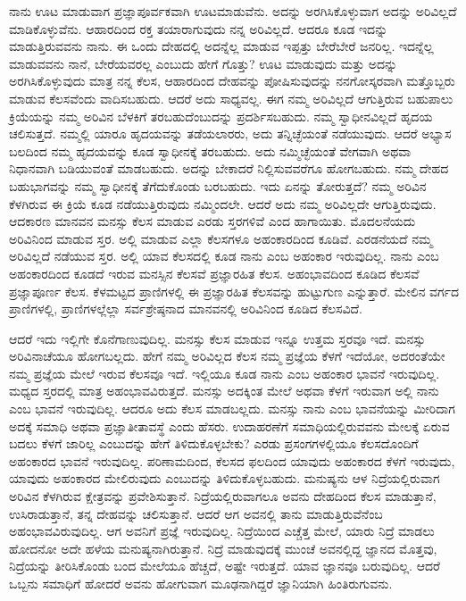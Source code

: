 \vskip 0.3cm

ನಾನು ಊಟ ಮಾಡುವಾಗ ಪ್ರಜ್ಞಾಪೂರ್ವಕವಾಗಿ ಊಟಮಾಡುವೆನು. ಅದನ್ನು ಅರಗಿಸಿಕೊಳ್ಳುವಾಗ ಅದನ್ನು ಅರಿವಿಲ್ಲದೆ ಮಾಡಿಕೊಳ್ಳುವೆನು. ಆಹಾರದಿಂದ ರಕ್ತ ತಯಾರಾಗುವುದು ನನ್ನ ಅರಿವಿಲ್ಲದೆ. ಆದರೂ ಕೂಡ ಇದನ್ನು ಮಾಡುತ್ತಿರುವವನು ನಾನು. ಈ ಒಂದು ದೇಹದಲ್ಲಿ ಅದನ್ನೆಲ್ಲ ಮಾಡುವ ಇಪ್ಪತ್ತು ಬೇರೆಬೇರೆ ಜನರಿಲ್ಲ. ಇದನ್ನೆಲ್ಲ ಮಾಡುವವನು ನಾನೆ, ಬೇರೆಯವರಲ್ಲ ಎಂಬುದು ಹೇಗೆ ಗೊತ್ತು? ಊಟ ಮಾಡುವುದು ಮತ್ತು ಅದನ್ನು ಅರಗಿಸಿಕೊಳ್ಳುವುದು ಮಾತ್ರ ನನ್ನ ಕೆಲಸ, ಆಹಾರದಿಂದ ದೇಹವನ್ನು ಪೋಷಿಸುವುದನ್ನು ನನಗೋಸ್ಕರವಾಗಿ ಮತ್ತೊಬ್ಬರು ಮಾಡುವ ಕೆಲಸವೆಂದು ವಾದಿಸಬಹುದು. ಆದರೆ ಅದು ಸಾಧ್ಯವಲ್ಲ. ಈಗ ನಮ್ಮ ಅರಿವಿಲ್ಲದೆ ಆಗುತ್ತಿರುವ ಬಹುಪಾಲು ಕ್ರಿಯೆಯನ್ನು ನಮ್ಮ ಅರಿವಿನ ಬೆಳಕಿಗೆ ತರಬಹುದೆಂಬುದನ್ನು ಪ್ರದರ್ಶಿಸಬಹುದು. ನಮ್ಮ ಸ್ವಾಧೀನವಿಲ್ಲದೆ ಹೃದಯ ಚಲಿಸುತ್ತದೆ. ನಮ್ಮಲ್ಲಿ ಯಾರೂ ಹೃದಯವನ್ನು ತಡೆಯಲಾರರು, ಅದು ತನ್ನಿಚ್ಛೆಯಂತೆ ನಡೆಯುವುದು. ಆದರೆ ಅಭ್ಯಾಸ ಬಲದಿಂದ ನಮ್ಮ ಹೃದಯವನ್ನು ಕೂಡ ಸ್ವಾಧೀನಕ್ಕೆ ತರಬಹುದು. ಅದು ನಮ್ಮಿಚ್ಛೆಯಂತೆ ವೇಗವಾಗಿ ಅಥವಾ ನಿಧಾನವಾಗಿ ಬಡಿಯುವಂತೆ ಮಾಡಬಹುದು. ಅದನ್ನು ಬೇಕಾದರೆ ನಿಲ್ಲಿಸುವವರೆಗೂ ಹೋಗಬಹುದು. ನಮ್ಮ ದೇಹದ ಬಹುಭಾಗವನ್ನು ನಮ್ಮ ಸ್ವಾಧೀನಕ್ಕೆ ತೆಗೆದುಕೊಂಡು ಬರಬಹುದು. ಇದು ಏನನ್ನು ತೋರುತ್ತದೆ? ನಮ್ಮ ಅರಿವಿನ ಕೆಳಗಿರುವ ಈ ಕ್ರಿಯೆ ಕೂಡ ನಡೆಯುತ್ತಿರುವುದು ನಮ್ಮಿಂದಲೇ. ಆದರೆ ಅದು ನಮ್ಮ ಅರಿವಿಲ್ಲದೇ ಆಗುತ್ತಿರುವುದು. ಆದಕಾರಣ ಮಾನವನ ಮನಸ್ಸು ಕೆಲಸ ಮಾಡುವ ಎರಡು ಸ್ತರಗಳಿವೆ ಎಂದ ಹಾಗಾಯಿತು. ಮೊದಲನೆಯದು ಅರಿವಿನಿಂದ ಮಾಡುವ ಸ್ತರ. ಅಲ್ಲಿ ಮಾಡುವ ಎಲ್ಲಾ ಕೆಲಸಗಳೂ ಅಹಂಕಾರದಿಂದ ಕೂಡಿವೆ. ಎರಡನೆಯದೆ ನಮ್ಮ ಅರಿವಿಲ್ಲದೆ ನಡೆಯುವ ಸ್ತರ. ಅಲ್ಲಿ ಯಾವ ಕೆಲಸದಲ್ಲಿ ಕೂಡ ನಾನು ಎಂಬ ಅಹಂಕಾರ ಇರುವುದಿಲ್ಲ. ನಾನು ಎಂಬ ಅಹಂಕಾರದಿಂದ ಕೂಡದೆ ಇರುವ ಮನಸ್ಸಿನ ಕೆಲಸವೆ ಪ್ರಜ್ಞಾರಹಿತ ಕೆಲಸ. ಅಹಂಭಾವದಿಂದ ಕೂಡಿದ ಕೆಲಸವೆ ಪ್ರಜ್ಞಾಪೂರ್ಣ ಕೆಲಸ. ಕೆಳಮಟ್ಟದ ಪ್ರಾಣಿಗಳಲ್ಲಿ ಈ ಪ್ರಜ್ಞಾರಹಿತ ಕೆಲಸವನ್ನು ಹುಟ್ಟುಗುಣ ಎನ್ನುತ್ತಾರೆ. ಮೇಲಿನ ವರ್ಗದ ಪ್ರಾಣಿಗಳಲ್ಲಿ, ಪ್ರಾಣಿಗಳಲ್ಲೆಲ್ಲಾ ಸರ್ವಶ್ರೇಷ್ಠನಾದ ಮಾನವನಲ್ಲಿ ಅರಿವಿನಿಂದ ಕೂಡಿದ ಕೆಲಸವಿದೆ. 

\vskip 0.3cm

ಆದರೆ ಇದು ಇಲ್ಲಿಗೇ ಕೊನೆಗಾಣುವುದಿಲ್ಲ. ಮನಸ್ಸು ಕೆಲಸ ಮಾಡುವ ಇನ್ನೂ ಉತ್ತಮ ಸ್ತರವೂ ಇದೆ. ಮನಸ್ಸು ಅರಿವಿನಾಚೆಯೂ ಹೋಗಬಲ್ಲದು. ಹೇಗೆ ನಮ್ಮ ಅರಿವಿಲ್ಲದ ಕೆಲಸ ನಮ್ಮ ಪ್ರಜ್ಞೆಯ ಕೆಳಗೆ ಇದೆಯೋ, ಅದರಂತೆಯೇ ನಮ್ಮ ಪ್ರಜ್ಞೆಯ ಮೇಲೆ ಇರುವ ಕೆಲಸವೂ ಇದೆ. ಇಲ್ಲಿಯೂ ಕೂಡ ನಾನು ಎಂಬ ಅಹಂಕಾರ ಭಾವನೆ ಇರುವುದಿಲ್ಲ. ಮಧ್ಯದ ಸ್ತರದಲ್ಲಿ ಮಾತ್ರ ಅಹಂಭಾವವಿರುತ್ತದೆ. ಮನಸ್ಸು ಅದಕ್ಕಿಂತ ಮೇಲೆ ಅಥವಾ ಕೆಳಗೆ ಇರುವಾಗ ಅಲ್ಲಿ ನಾನು ಎಂಬ ಭಾವನೆ ಇರುವುದಿಲ್ಲ. ಆದರೂ ಅದು ಕೆಲಸ ಮಾಡಬಲ್ಲದು. ಮನಸ್ಸು ನಾನು ಎಂಬ ಭಾವನೆಯನ್ನು ಮೀರಿದಾಗ ಅದಕ್ಕೆ ಸಮಾಧಿ ಅಥವಾ ಪ್ರಜ್ಞಾತೀತಾವಸ್ಥೆ ಎಂದು ಹೆಸರು. ಉದಾಹರಣೆಗೆ ಸಮಾಧಿಯಲ್ಲಿರುವವನು ಮೇಲಕ್ಕೆ ಏರುವ ಬದಲು ಕೆಳಗೆ ಜಾರಿಲ್ಲ ಎಂಬುದನ್ನು ಹೇಗೆ ತಿಳಿದುಕೊಳ್ಳಬೇಕು? ಎರಡು ಪ್ರಸಂಗಗಳಲ್ಲಿಯೂ ಕೆಲಸದೊಂದಿಗೆ ಅಹಂಕಾರದ ಭಾವನೆ ಇರುವುದಿಲ್ಲ. ಪರಿಣಾಮದಿಂದ, ಕೆಲಸದ ಫಲದಿಂದ ಯಾವುದು ಅಹಂಕಾರದ ಕೆಳಗೆ ಇರುವುದು, ಯಾವುದು ಅಹಂಕಾರದ ಮೇಲಿರುವುದು ಎಂಬುದನ್ನು ತಿಳಿದುಕೊಳ್ಳಬಹುದು. ಮನುಷ್ಯನು ಆಳ ನಿದ್ರೆಯಲ್ಲಿರುವಾಗ ಅರಿವಿನ ಕೆಳಗಿರುವ ಕ್ಷೇತ್ರವನ್ನು ಪ್ರವೇಶಿಸುತ್ತಾನೆ. ನಿದ್ರೆಯಲ್ಲಿರುವಾಗಲೂ ಅವನು ದೇಹದಿಂದ ಕೆಲಸ ಮಾಡುತ್ತಾನೆ, ಉಸಿರಾಡುತ್ತಾನೆ, ತನ್ನ ದೇಹವನ್ನು ಚಲಿಸುತ್ತಾನೆ. ಆದರೆ ಆಗ ಅವನಲ್ಲಿ ತಾನು ಮಾಡುತ್ತಿರುವೆನೆಂಬ ಅಹಂಭಾವವಿರುವುದಿಲ್ಲ. ಆಗ ಅವನಿಗೆ ಪ್ರಜ್ಞೆ ಇರುವುದಿಲ್ಲ. ನಿದ್ರೆಯಿಂದ ಎಚ್ಚೆತ್ತ ಮೇಲೆ, ಯಾರು ನಿದ್ರೆ ಮಾಡಲು ಹೋದನೋ ಅದೇ ಹಳೆಯ ಮನುಷ್ಯನಾಗಿರುತ್ತಾನೆ. ನಿದ್ರೆ ಮಾಡುವುದಕ್ಕೆ ಮುಂಚೆ ಅವನಲ್ಲಿದ್ದ ಜ್ಞಾನದ ಮೊತ್ತವು, ನಿದ್ರೆಯನ್ನು ತೀರಿಸಿಕೊಂಡು ಬಂದ ಮೇಲೆಯೂ ಹೆಚ್ಚದೆ, ಅಷ್ಟೇ ಇರುತ್ತದೆ. ಯಾವ ಜ್ಞಾನವೂ ಬರುವುದಿಲ್ಲ. ಆದರೆ ಒಬ್ಬನು ಸಮಾಧಿಗೆ ಹೋದರೆ ಅವನು ಹೋಗುವಾಗ ಮೂಢನಾಗಿದ್ದರೆ ಜ್ಞಾನಿಯಾಗಿ ಹಿಂತಿರುಗುವನು. 

